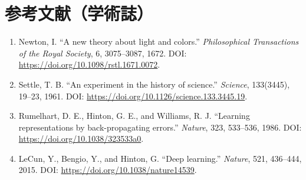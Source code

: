 \section*{参考文献（学術誌）}
\begin{enumerate}[leftmargin=2.4em]
\item Newton, I. ``A new theory about light and colors.'' \textit{Philosophical Transactions of the Royal Society}, 6, 3075--3087, 1672. DOI: \url{https://doi.org/10.1098/rstl.1671.0072}.
\item Settle, T. B. ``An experiment in the history of science.'' \textit{Science}, 133(3445), 19--23, 1961. DOI: \url{https://doi.org/10.1126/science.133.3445.19}.
\item Rumelhart, D. E., Hinton, G. E., and Williams, R. J. ``Learning representations by back-propagating errors.'' \textit{Nature}, 323, 533--536, 1986. DOI: \url{https://doi.org/10.1038/323533a0}.
\item LeCun, Y., Bengio, Y., and Hinton, G. ``Deep learning.'' \textit{Nature}, 521, 436--444, 2015. DOI: \url{https://doi.org/10.1038/nature14539}.
\end{enumerate}
